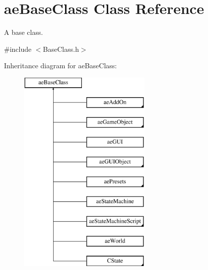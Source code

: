 \hypertarget{classae_base_class}{}\section{ae\+Base\+Class Class Reference}
\label{classae_base_class}


A base class.  




{\ttfamily \#include $<$Base\+Class.\+h$>$}

Inheritance diagram for ae\+Base\+Class\+:\begin{figure}[H]
\begin{center}
\leavevmode
\includegraphics[height=10.000000cm]{classae_base_class}
\end{center}
\end{figure}
